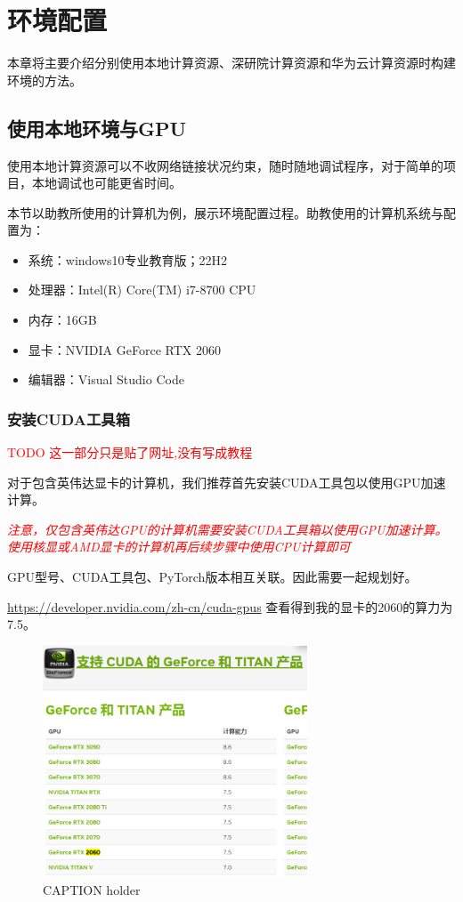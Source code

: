 \chapter{环境配置}

本章将主要介绍分别使用本地计算资源、深研院计算资源和华为云计算资源时构建环境的方法。

\section{使用本地环境与GPU}\label{sec:local-env}

使用本地计算资源可以不收网络链接状况约束，随时随地调试程序，对于简单的项目，本地调试也可能更省时间。

本节以助教所使用的计算机为例，展示环境配置过程。助教使用的计算机系统与配置为：
\begin{itemize}
    \item 系统：windows10专业教育版；22H2
    \item 处理器：Intel(R) Core(TM) i7-8700 CPU 
    \item 内存：16GB
    \item 显卡：NVIDIA GeForce RTX 2060
    \item 编辑器：Visual Studio Code
\end{itemize}

\subsection{安装CUDA工具箱}
\textcolor{red}{TODO 这一部分只是贴了网址,没有写成教程}


对于包含英伟达显卡的计算机，我们推荐首先安装CUDA工具包以使用GPU加速计算。

\textcolor{red}{\emph{注意，仅包含英伟达GPU的计算机需要安装CUDA工具箱以使用GPU加速计算。使用核显或AMD显卡的计算机再后续步骤中使用CPU计算即可}}

GPU型号、CUDA工具包、PyTorch版本相互关联。因此需要一起规划好。

\url{https://developer.nvidia.com/zh-cn/cuda-gpus}
查看得到我的显卡的2060的算力为7.5。

\begin{figure}[htbp]
    \centering
    \includegraphics[width=0.7\textwidth]{figures/nvidia-rtx-2060-capability.png}
    \caption{CAPTION holder}
    \label{LABEL holder}
\end{figure}


